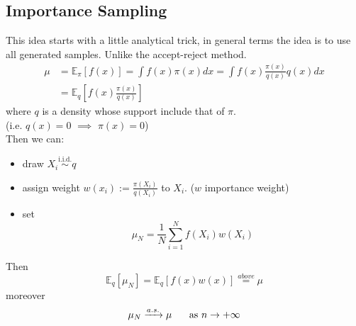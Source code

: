 \documentclass{article}
\begin{document}
	\subsection{Importance Sampling}
	This idea starts with a little analytical trick, in general terms the idea is to use all generated samples. Unlike the accept-reject method. \\
	\begin{equation*}
		\begin{split}
			\mu&= \mathbb{E}_{\pi}[f(x)] = \int f(x) \pi(x) dx = \int f(x) \frac{\pi(x)}{q(x)} q(x) dx \\
			&= \mathbb{E}_{q}[f(x)\frac{\pi(x)}{q(x)}]
		\end{split}
	\end{equation*}
	where $q$ is a density whose support include that of $\pi$.\\ (i.e. $q(x)=0$ $\implies$ $\pi(x)=0$)\\
	Then we can:
	\begin{itemize}
		\item draw $X_i \stackrel{\text{i.i.d.}}{\sim} q$ 
		\item assign weight $w(x_i):= \frac{\pi(X_i)}{q(X_ i)}$ to $X_i$. ($w$ importance weight)
		\item  set 
		\begin{equation*}
			\mu_N= \frac{1}{N} \sum_{i=1}^N f(X_i)w(X_i)
		\end{equation*}
	\end{itemize}
	Then
	\begin{equation*}
		\mathbb{E}_q[\mu_N]= \mathbb{E}_q [f(x)w(x)] \stackrel{above}{=} \mu 
	\end{equation*}
	moreover
	\begin{equation*}
		\mu_N \xrightarrow{a.s.} \mu \hspace{0.5 cm} \text{ as } n \rightarrow + \infty
	\end{equation*}
\end{document}
